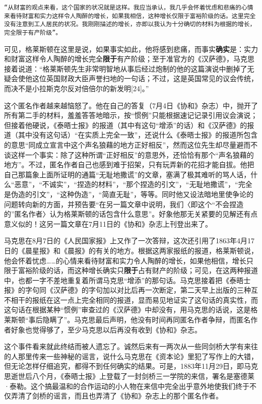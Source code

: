 \documentclass{ctexbook}
\begin{document}
\texttt{“从财富的观点来看，这个国家的状况就是这样。我应当承认，我几乎会怀着忧虑和悲痛的心情来看待财富和实力这样令人陶醉的增长，如果我相信，这种增长仅限于富裕阶级的话。这里完全没有注意到工人居民的状况。我刚刚描述的增长，亦即以我认为十分确切的材料为根据的增长，完全限于有产阶级”。}

可见，格莱斯顿在这里是说，如果事实如此，他将感到悲痛，而事实\textbf{确实}是：实力和财富这样令人陶醉的增长完全\textbf{限于}有产阶级；至于准官方的《汉萨德》，马克思接着说道：“格莱斯顿先生非常明智地从事后经过炮制的他的这篇演说中删掉了无疑会使他这位英国财政大臣声誉扫地的一句话；不过，这是英国常见的议会传统，而决不是小拉斯克尔反对倍倍尔的新发明[24]。”

这个匿名作者越来越恼怒了。他在自己的答复（7月4日《协和》杂志）中，抛开了所有第二手的材料，羞羞答答地暗示，按“惯例”只能根据速记记录引用议会演说；但接着他硬说，《泰晤士报》的报道（其中有这句“增添”的话）和《汉萨德》的报道（其中没有这句话）“在实质上完全一致”，还说什么《泰晤士报》的报道所包含的意思“同成立宣言中这个声名狼藉的地方正好相反”，然而这位先生却尽量避而不谈这样一个事实：除了这种所谓“正好相反”的意思外，还恰恰有那个“声名狼藉的地方”。不过，匿名作者自己也感到难于招架，只有玩弄新的花招才能自拔。他把自己那篇象上面所证明的通篇“无耻地撒谎”的文章，塞满了极其难听的骂人话，什么“恶意”，“不诚实”，“捏造的材料”，“那个捏造的引文”，“无耻地撒谎”，“完全是伪造的引文”，“这种伪造”，“简直无耻”，等等。同时他又设法暗地里使争论的问题转向新的方面，并预告要“在另一篇文章中说明，我们〈即这个“不会捏造的”匿名作者〉认为格莱斯顿的话包含什么意思”。好象他那无关紧要的见解还有点意义似的！这另一篇文章在7月11日的《协和》杂志上刊登出来了。

马克思在8月7日的《人民国家报》上又作了一次答辩，这次还引用了1863年4月17日的《晨星报》和《晨报》的有关的地方。根据这两家报纸的报道，格莱斯顿说，他会怀着忧虑……的心情来看待财富和实力令人陶醉的增长，如果他相信，增长只限于富裕阶级的话，而这种增长确实只\textbf{限于}占有财产的阶级；可见，在这两种报道中，也都一字不差地重复着所谓马克思“增添”的那句话。马克思接着把《泰晤士报》的字句同《汉萨德》的字句加以对比后再一次断定，第二天早上出版的三种互不相干的报纸在这一点上完全相同的报道，显而易见地证实了这句话的真实性，而这句话在根据某种“惯例”审查过的《汉萨德》中却没有，用马克思的话说，这是格莱斯顿“事后隐瞒了”。马克思最后声明，他没有时间再同匿名作者争辩，而匿名作者好象也觉得够了，至少马克思以后再没有收到《协和》杂志。

这个事件看来就此终结而被人遗忘了。诚然后来有一两次从一些同剑桥大学有来往的人那里传来一些神秘的谣言，说什么马克思在《资本论》里犯了写作上的大错，但无论怎样仔细追究，都得不到任何确实的结果。可是，1883年11月29日，即马克思逝世后八个月，《泰晤士报》上登载了一封剑桥三一学院的来信，署名是塞德莱·泰勒。这个搞最温和的合作运动的小人物在来信中完全出乎意外地使我们终于不仅弄清了剑桥的谣言，而且也弄清了《协和》杂志上的那个匿名作者。
\end{document}
